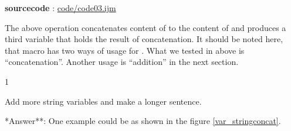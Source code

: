 \textbf{sourcecode} : \href{http://www.example.com/contents}{code/code03.ijm}

The above operation concatenates content of  to the content of  and produces a third variable  that holds the result of concatenation. It should be noted here, that macro has two ways of usage for \ilcom{+}. What we tested in above is ``concatenation''. Another usage is ``addition'' in the next section.

\begin{indentexercise}
{1}

\item Add more string variables and make a longer sentence.\\

\item **Answer**: One example could be as shown in the figure \ref{var_stringconcat}.

\end{indentexercise}